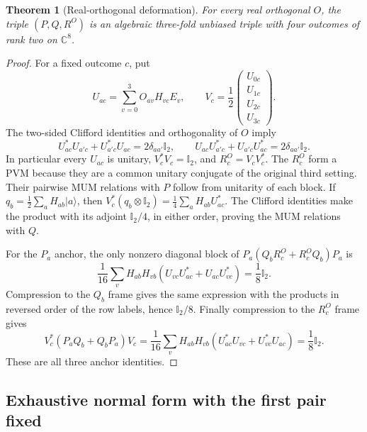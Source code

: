 \documentclass[11pt]{article}
\newtheorem{theorem}{Theorem}[section]
\newcommand{\id}{\mathbb I}
\begin{document}
\begin{theorem}[Real-orthogonal deformation]\label{thm:rotations}
For every real orthogonal $O$, the triple $(P,Q,R^O)$ is an algebraic
three-fold unbiased triple with four outcomes of rank two on $\mathbb C^8$.

\end{theorem}
\begin{proof}
For a fixed outcome $c$, put
\[
 U_{ac}=\sum_{v=0}^3 O_{av}H_{vc}E_v,
 \qquad V_c=\frac12\begin{pmatrix}U_{0c}\\U_{1c}\\U_{2c}\\U_{3c}\end{pmatrix}.
\]
The two-sided Clifford identities and orthogonality of $O$ imply
\[
 U_{ac}^*U_{a'c}+U_{a'c}^*U_{ac}=2\delta_{aa'}\id_2,
 \qquad
 U_{ac}U_{a'c}^*+U_{a'c}U_{ac}^*=2\delta_{aa'}\id_2.
\]
In particular every $U_{ac}$ is unitary, $V_c^*V_c=\id_2$, and
$R_c^O=V_cV_c^*$. The $R_c^O$ form a PVM because they are a common
unitary conjugate of the original third setting. Their pairwise MUM
relations with $P$ follow from unitarity of each block. If
$q_b=\frac12\sum_a H_{ab}|a\rangle$, then
$V_c^*(q_b\otimes\id_2)=\frac14\sum_aH_{ab}U_{ac}^*$.
The Clifford identities make the product with its adjoint $\id_2/4$,
in either order, proving the MUM relations with $Q$.

For the $P_a$ anchor, the only nonzero diagonal block of
$P_a(Q_bR_c^O+R_c^OQ_b)P_a$ is
\[
 \frac1{16}\sum_v H_{ab}H_{vb}
 (U_{vc}U_{ac}^*+U_{ac}U_{vc}^*)=\frac18\id_2.
\]
Compression to the $Q_b$ frame gives the same expression with the
products in reversed order of the row labels, hence $\id_2/8$.
Finally compression to the $R_c^O$ frame gives
\[
 V_c^*(P_aQ_b+Q_bP_a)V_c
 =\frac1{16}\sum_v H_{ab}H_{vb}
 (U_{ac}^*U_{vc}+U_{vc}^*U_{ac})=\frac18\id_2.
\]
These are all three anchor identities.

\end{proof}

\subsection{Exhaustive normal form with the first pair fixed}
\end{document}

